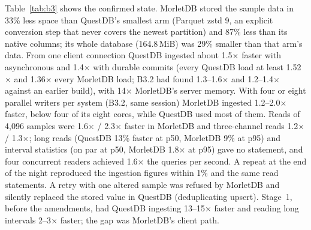 \documentclass[sigconf,nonacm]{acmart}
\newcommand{\M}{MorletDB}
\begin{document}
Table~\ref{tab:b3} shows the confirmed state. \M{} stored the sample data in 33\% less space than QuestDB's smallest arm (Parquet zstd 9, an explicit conversion step that never covers the newest partition) and 87\% less than its native columns; its whole database (164.8\,MiB) was 29\% smaller than that arm's data. From one client connection QuestDB ingested about 1.5$\times$ faster with asynchronous and 1.4$\times$ with durable commits (every QuestDB load at least 1.52$\times$ and 1.36$\times$ every \M{} load; B3.2 had found 1.3--1.6$\times$ and 1.2--1.4$\times$ against an earlier build), with 14$\times$ \M{}'s server memory. With four or eight parallel writers per system (B3.2, same session) \M{} ingested 1.2--2.0$\times$ faster, below four of its eight cores, while QuestDB used most of them. Reads of 4,096 samples were 1.6$\times$ / 2.3$\times$ faster in \M{} and three-channel reads 1.2$\times$ / 1.3$\times$; long reads (QuestDB 13\% faster at p50, \M{} 9\% at p95) and interval statistics (on par at p50, \M{} 1.8$\times$ at p95) gave no statement, and four concurrent readers achieved 1.6$\times$ the queries per second. A repeat at the end of the night reproduced the ingestion figures within 1\% and the same read statements. A retry with one altered sample was refused by \M{} and silently replaced the stored value in QuestDB (deduplicating upsert). Stage~1, before the amendments, had QuestDB ingesting 13--15$\times$ faster and reading long intervals 2--3$\times$ faster; the gap was \M{}'s client path.
\end{document}
